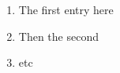\documentclass[11pt]{article}
\begin{document}
\begin{enumerate}[label=Exercise \arabic*), itemsep=1in]
\item The first entry here
\item Then the second
\item etc
\end{enumerate}
\end{document}

